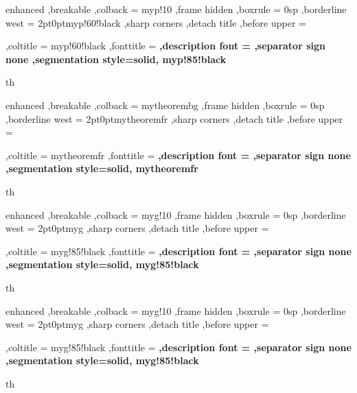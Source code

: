 {%
	enhanced
	,breakable
	,colback = myp!10
	,frame hidden
	,boxrule = 0sp
	,borderline west = {2pt}{0pt}{myp!60!black}
	,sharp corners
	,detach title
	,before upper = \tcbtitle\par\smallskip
	,coltitle = myp!60!black
	,fonttitle = \bfseries\sffamily
	,description font = \mdseries
	,separator sign none
	,segmentation style={solid, myp!85!black}
}
{th}
{%
	enhanced
	,breakable
	,colback = mytheorembg
	,frame hidden
	,boxrule = 0sp
	,borderline west = {2pt}{0pt}{mytheoremfr}
	,sharp corners
	,detach title
	,before upper = \tcbtitle\par\smallskip
	,coltitle = mytheoremfr
	,fonttitle = \bfseries\sffamily
	,description font = \mdseries
	,separator sign none
	,segmentation style={solid, mytheoremfr}
}
{th}


{%
	enhanced
	,breakable
	,colback = myg!10
	,frame hidden
	,boxrule = 0sp
	,borderline west = {2pt}{0pt}{myg}
	,sharp corners
	,detach title
	,before upper = \tcbtitle\par\smallskip
	,coltitle = myg!85!black
	,fonttitle = \bfseries\sffamily
	,description font = \mdseries
	,separator sign none
	,segmentation style={solid, myg!85!black}
}
{th}


{%
	enhanced
	,breakable
	,colback = myg!10
	,frame hidden
	,boxrule = 0sp
	,borderline west = {2pt}{0pt}{myg}
	,sharp corners
	,detach title
	,before upper = \tcbtitle\par\smallskip
	,coltitle = myg!85!black
	,fonttitle = \bfseries\sffamily
	,description font = \mdseries
	,separator sign none
	,segmentation style={solid, myg!85!black}
}
{th}


